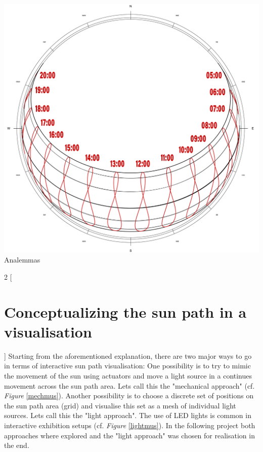 \documentclass[a4paper,9pt]{article}
\begin{document}
\hfill
\begin{minipage}{0.28\linewidth}
    \centering
    \includegraphics[width=\linewidth]{Images/sunpath3_1.jpg}
   \\{Analemmas}
     \label{sunpath2}
\end{minipage}
\newpage
\begin{multicols}{2}
[
\section{Conceptualizing the sun path in a visualisation}
]
Starting from the aforementioned explanation, there are two major ways to go in terms of interactive sun path visualisation: One possibility is to try to mimic the movement of the sun using actuators and move a light source in a continues movement across the sun path area. Lets call this the "mechanical approach" (cf. \textit{Figure} \ref{mechmus}). Another possibility is to choose a discrete set of positions on the sun path area (grid) and visualise this set as a mesh of individual light sources. Lets call this the "light approach". The use of LED lights is common in interactive exhibition setups (cf. \textit{Figure} \ref{lightmus}). In the following project both approaches where explored and the "light approach" was chosen for realisation in the end.
\end{multicols}
\end{document}
